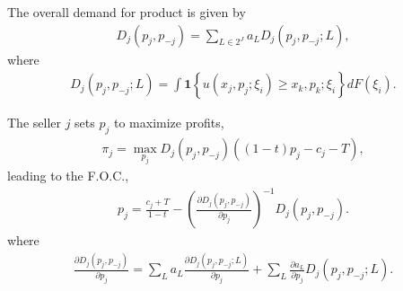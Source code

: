 The overall demand for product is given by
\begin{equation}
    \begin{aligned}
        D_j(p_j,p_{-j})=\sum_{L\in 2^J}a_L D_j(p_j,p_{-j};L),
    \end{aligned}
    \nonumber
\end{equation}
where
\begin{equation}
    \begin{aligned}
        D_j(p_j,p_{-j};L)=\int \mathbf{1}\left\{u(x_j,p_j;\xi_i)\geq x_k,p_k;\xi_i\right\}d F(\xi_i).
    \end{aligned}
    \nonumber
\end{equation}

The seller $j$ sets $p_j$ to maximize profits,
\begin{equation}
    \begin{aligned}
        \pi_j=\max_{p_j}D_j(p_j,p_{-j})\left((1-t)p_j-c_j-T\right),
    \end{aligned}
    \nonumber
\end{equation}
leading to the F.O.C.,
\begin{equation}
    \begin{aligned}
        p_j=\frac{c_j+T}{1-t}-\left(\frac{\partial D_j(p_j,p_{-j})}{\partial p_j}\right)^{-1}D_j(p_j,p_{-j}).
    \end{aligned}
    \nonumber
\end{equation}
where
\begin{equation}
    \begin{aligned}
        \frac{\partial D_j(p_j,p_{-j})}{\partial p_j}=\sum_{L}a_L\frac{\partial D_j(p_j,p_{-j};L)}{\partial p_j}+\sum_{L}\frac{\partial a_L}{\partial p_j}D_j(p_j,p_{-j};L).
    \end{aligned}
    \nonumber
\end{equation}